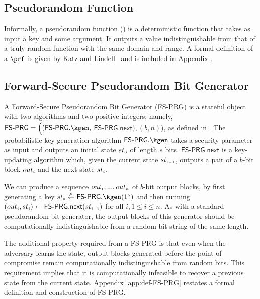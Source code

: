  
 

\subsection{Pseudorandom Function}\label{subsec:PRF}

Informally, a pseudorandom function (\prf) is a deterministic function that takes as input a key and some argument. It outputs a value indistinguishable from that of a truly random function with the same domain and range.  A formal definition of a $\prf$ is given by Katz and Lindell~\cite{KatzLindell2014} and is included in Appendix .


\subsection{Forward-Secure Pseudorandom Bit Generator}
A Forward-Secure Pseudorandom Bit Generator (FS-PRG) is a stateful object with two algorithms and two positive integers; namely, $\mathsf{FS\text{-}PRG} = \Big((\mathsf{FS\text{-}PRG}.\kgen, $ $ \mathsf{FS\text{-}PRG.next}),( b, n)\Big)$, as defined in \cite{BellareY03}.  The probabilistic key generation algorithm $\mathsf{FS\text{-}PRG}.\kgen$ takes a security parameter as input and outputs an initial state ${st}_{\scriptscriptstyle 0}$ of length $s$ bits. $\mathsf{FS\text{-}PRG.next}$ is a key-updating algorithm which, given the current state ${st}_{\scriptscriptstyle i-1}$, outputs a pair of a $b$-bit block ${out}_{\scriptscriptstyle i}$ and the next state ${st}_{\scriptscriptstyle i}$. 

We can produce a sequence  ${out}_{\scriptscriptstyle 1},..., {out}_{\scriptscriptstyle n}$  of  $b$-bit output blocks, by first generating a key  ${st}_{\sss 0}\stackrel{\sss \$}\leftarrow\mathsf{FS\text{-}PRG}.\kgen(1^{\sss \lambda})$ and then running $({out}_{\scriptscriptstyle i}, st_{\scriptscriptstyle i})\leftarrow  \mathsf{FS\text{-}PRG.next} (st_{\scriptscriptstyle i-1})$ for all $i, 1\leq i\leq n$. As with a standard pseudorandom bit generator, the output blocks of this generator should be computationally indistinguishable from a random bit
string of the same length. 

The additional property required from a
FS-PRG is that even when the
adversary learns the state, output blocks generated before the point of
compromise remain computationally indistinguishable from random bits.
This requirement implies that it is computationally infeasible to
recover a previous state from the current state. Appendix \ref{app:def-FS-PRG} restates a formal definition and construction of  FS-PRG. 


